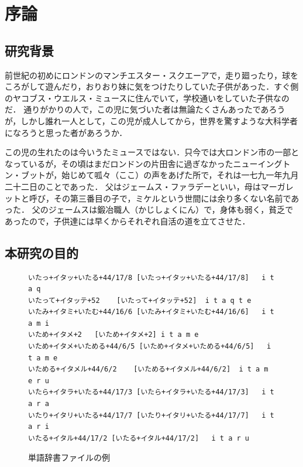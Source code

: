 \chapter{序論} \label{chap:jyoron}


\section{研究背景}%

前世紀の初めにロンドンのマンチエスター・スクエーアで，走り廻ったり，球をころがして遊んだり，おりおり妹に気をつけたりしていた子供があった．すぐ側のヤコブス・ウエルス・ミュースに住んでいて，学校通いをしていた子供なのだ．
通りがかりの人で，この児に気づいた者は無論たくさんあったであろうが，しかし誰れ一人として，この児が成人してから，世界を驚すような大科学者になろうと思った者があろうか．

この児の生れたのは今いうたミュースではない．只今では大ロンドン市の一部となっているが，その頃はまだロンドンの片田舎に過ぎなかったニューイングトン・ブットが，始じめて呱々（ここ）の声をあげた所で，それは一七九一年九月二十二日のことであった．
父はジェームス・ファラデーといい，母はマーガレットと呼び，その第三番目の子で，ミケルという世間には余り多くない名前であった．
父のジェームスは鍛冶職人（かじしょくにん）で，身体も弱く，貧乏であったので，子供達には早くからそれぞれ自活の道を立てさせた\cite{Furui}．


\section{本研究の目的}%

\begin{figure}[t]
\begin{center}
\begin{verbatim}
いたっ+イタッ+いたる+44/17/8	[いたっ+イタッ+いたる+44/17/8]	i t a q 
いたって+イタッテ+52	[いたって+イタッテ+52]	i t a q t e 
いたみ+イタミ+いたむ+44/16/6	[いたみ+イタミ+いたむ+44/16/6]	i t a m i 
いため+イタメ+2	[いため+イタメ+2]	i t a m e 
いため+イタメ+いためる+44/6/5	[いため+イタメ+いためる+44/6/5]	i t a m e 
いためる+イタメル+44/6/2	[いためる+イタメル+44/6/2]	i t a m e r u 
いたら+イタラ+いたる+44/17/3	[いたら+イタラ+いたる+44/17/3]	i t a r a 
いたり+イタリ+いたる+44/17/7	[いたり+イタリ+いたる+44/17/7]	i t a r i 
いたる+イタル+44/17/2	[いたる+イタル+44/17/2]	i t a r u 
\end{verbatim}
\caption{単語辞書ファイルの例}
\label{fig:dic}
\end{center}
\end{figure}

